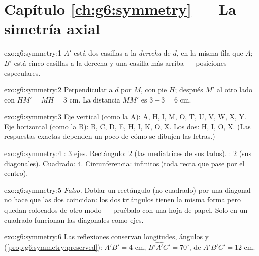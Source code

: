\section*{Capítulo \ref{ch:g6:symmetry} --- La simetría axial}

\begin{solution}{exo:g6:symmetry:1}
$A'$ está dos casillas a la \emph{derecha} de $d$, en la misma fila que
$A$; $B'$ está cinco casillas a la derecha y una casilla más arriba --- posiciones
especulares.
\end{solution}

\begin{solution}{exo:g6:symmetry:2}
Perpendicular a $d$ por $M$, con pie $H$; después $M'$ al otro
lado con $HM' = MH = 3$ cm. La distancia $MM'$ es
$3 + 3 = 6$ cm.
\end{solution}

\begin{solution}{exo:g6:symmetry:3}
Eje vertical (como la A): A, H, I, M, O, T, U, V, W, X, Y.
Eje horizontal (como la B): B, C, D, E, H, I, K, O, X.
Los dos: H, I, O, X.
(Las respuestas exactas dependen un poco de cómo se dibujen las letras.)
\end{solution}

\begin{solution}{exo:g6:symmetry:4}
: $3$ ejes. Rectángulo: $2$ (las mediatrices
de sus lados). : $2$ (sus diagonales). Cuadrado: $4$.
Circunferencia: infinitos (toda recta que pase por el centro).
\end{solution}

\begin{solution}{exo:g6:symmetry:5}
\emph{Falso.} Doblar un rectángulo (no cuadrado) por una diagonal no
hace que las dos  coincidan: los dos triángulos tienen la misma
forma pero quedan colocados de otro modo --- pruébalo con una hoja de papel. Solo en un
cuadrado funcionan las diagonales como ejes.
\end{solution}

\begin{solution}{exo:g6:symmetry:6}
Las reflexiones conservan longitudes, ángulos y 
(\cref{prop:g6:symmetry:preserved}): $A'B' = 4$ cm,
$\widehat{B'A'C'} = 70^\circ$,  de $A'B'C' = 12$ cm.
\end{solution}

